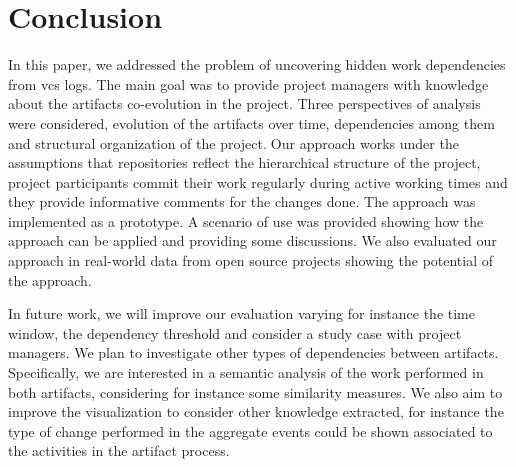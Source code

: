 \section{Conclusion}
\label{sec:conclusion}

In this paper, we addressed the problem of uncovering hidden work dependencies from \gls{vcs} logs. The main goal was to provide project managers with knowledge about the artifacts co-evolution in the project. Three perspectives of analysis were considered, evolution of the artifacts over time, dependencies among them and structural organization of the project.Our approach works under the assumptions that repositories reflect the hierarchical structure of the project, project participants commit their work regularly during active working
times and they provide informative comments for the changes done. The approach was implemented as a prototype. A scenario of use was provided showing how the approach can be applied and providing some discussions. We also evaluated our approach in real-world data from open source projects showing the potential of the approach.

In future work, we will improve our evaluation varying for instance the time window, the dependency threshold and consider a study case with project managers. We plan to investigate other types of dependencies between artifacts. Specifically, we are interested in a semantic analysis of the work performed in both artifacts, considering for instance some similarity measures. We also aim to improve the visualization to consider other knowledge extracted, for instance the type of change performed in the aggregate events could be shown associated to the activities in the artifact process.